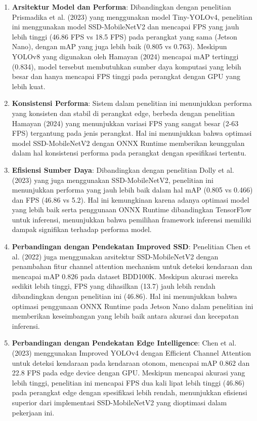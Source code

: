 \begin{enumerate}
    \item \textbf{Arsitektur Model dan Performa}: Dibandingkan dengan penelitian Prismadika et al. (2023) yang menggunakan model Tiny-YOLOv4, penelitian ini menggunakan model SSD-MobileNetV2 dan mencapai FPS yang jauh lebih tinggi (46.86 FPS vs 18.5 FPS) pada perangkat yang sama (Jetson Nano), dengan mAP yang juga lebih baik (0.805 vs 0.763). Meskipun YOLOv8 yang digunakan oleh Hamayan (2024) mencapai mAP tertinggi (0.834), model tersebut membutuhkan sumber daya komputasi yang lebih besar dan hanya mencapai FPS tinggi pada perangkat dengan GPU yang lebih kuat.
    
    \item \textbf{Konsistensi Performa}: Sistem dalam penelitian ini menunjukkan performa yang konsisten dan stabil di perangkat edge, berbeda dengan penelitian Hamayan (2024) yang menunjukkan variasi FPS yang sangat besar (2-63 FPS) tergantung pada jenis perangkat. Hal ini menunjukkan bahwa optimasi model SSD-MobileNetV2 dengan ONNX Runtime memberikan keunggulan dalam hal konsistensi performa pada perangkat dengan spesifikasi tertentu.
    
    \item \textbf{Efisiensi Sumber Daya}: Dibandingkan dengan penelitian Dolly et al. (2023) yang juga menggunakan SSD-MobileNetV2, penelitian ini menunjukkan performa yang jauh lebih baik dalam hal mAP (0.805 vs 0.466) dan FPS (46.86 vs 5.2). Hal ini kemungkinan karena adanya optimasi model yang lebih baik serta penggunaan ONNX Runtime dibandingkan TensorFlow untuk inferensi, menunjukkan bahwa pemilihan framework inferensi memiliki dampak signifikan terhadap performa model.
    
    \item \textbf{Perbandingan dengan Pendekatan Improved SSD}: Penelitian Chen et al. (2022) juga menggunakan arsitektur SSD-MobileNetV2 dengan penambahan fitur channel attention mechanism untuk deteksi kendaraan dan mencapai mAP 0.826 pada dataset BDD100K. Meskipun akurasi mereka sedikit lebih tinggi, FPS yang dihasilkan (13.7) jauh lebih rendah dibandingkan dengan penelitian ini (46.86). Hal ini menunjukkan bahwa optimasi penggunaan ONNX Runtime pada Jetson Nano dalam penelitian ini memberikan keseimbangan yang lebih baik antara akurasi dan kecepatan inferensi.
    
    \item \textbf{Perbandingan dengan Pendekatan Edge Intelligence}: Chen et al. (2023) menggunakan Improved YOLOv4 dengan Efficient Channel Attention untuk deteksi kendaraan pada kendaraan otonom, mencapai mAP 0.862 dan 22.8 FPS pada edge device dengan GPU. Meskipun mencapai akurasi yang lebih tinggi, penelitian ini mencapai FPS dua kali lipat lebih tinggi (46.86) pada perangkat edge dengan spesifikasi lebih rendah, menunjukkan efisiensi superior dari implementasi SSD-MobileNetV2 yang dioptimasi dalam pekerjaan ini.
    

\end{enumerate}
